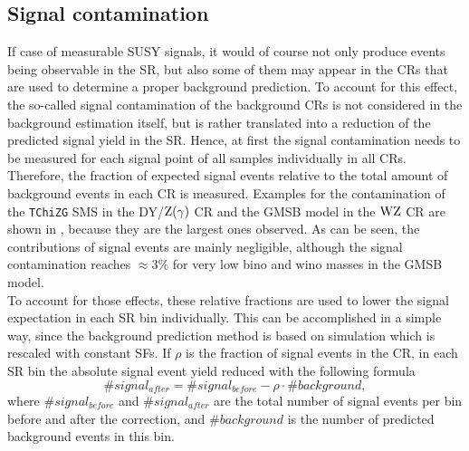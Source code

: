 \subsection{Signal contamination}\label{sec:signalCont}
If case of measurable SUSY signals, it would of course not only produce events being observable in the SR, but also some of them may appear in the CRs that are used to determine a proper background prediction. To account for this effect, the so-called signal contamination of the background CRs is not considered in the background estimation itself, but is rather translated into a reduction of the predicted signal yield in the SR. Hence, at first the signal contamination needs to be measured for each signal point of all samples individually in all CRs.\\
Therefore, the fraction of expected signal events relative to the total amount of background events in each CR is measured. Examples for the contamination of the \texttt{TChiZG} SMS in the DY/$\mathrm{Z}(\gamma)$ CR and the GMSB model in the $\mathrm{W}\mathrm{Z}$ CR are shown in , because they are the largest ones observed. As can be seen, the contributions of signal events are mainly negligible, although the signal contamination reaches $\approx 3\%$ for very low bino and wino masses in the GMSB model.\\
To account for those effects, these relative fractions are used to lower the signal expectation in each SR bin individually. This can be accomplished in a simple way, since the background prediction method is based on simulation which is rescaled with constant SFs. If $\rho$ is the fraction of signal events in the CR, in each SR bin the absolute signal event yield reduced with the following formula
\begin{equation}
 \#signal_{after} = \#signal_{before} - \rho\cdot\#background,
\end{equation}
where $\#signal_{before}$ and $\#signal_{after}$ are the total number of signal events per bin before and after the correction, and $\#background$ is the number of predicted background events in this bin.

